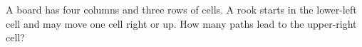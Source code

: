 A board has four columns and three rows of cells. A rook starts in the lower-left cell and may move one cell right or up. How many paths lead to the upper-right cell?
